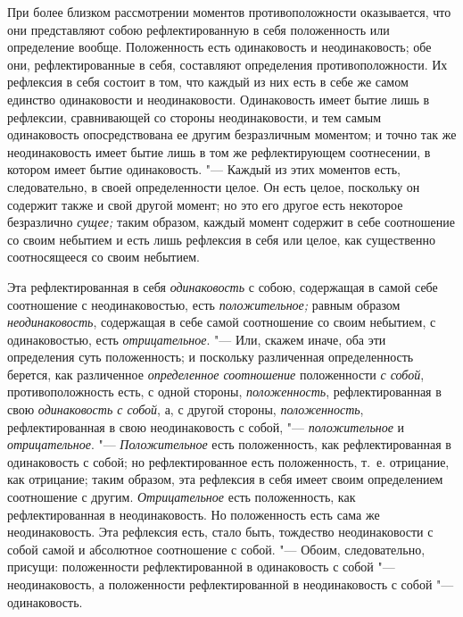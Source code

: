 При более близком рассмотрении моментов противоположности оказывается, что
они представляют собою рефлектированную в себя положенность или определение
вообще. Положенность есть одинаковость и неодинаковость; обе они,
рефлектированные в себя, составляют определения противоположности. Их
рефлексия в себя состоит в том, что каждый из них есть в себе же самом
единство одинаковости и неодинаковости. Одинаковость имеет бытие лишь в
рефлексии, сравнивающей со стороны неодинаковости, и тем самым одинаковость
опосредствована ее другим безразличным моментом; и точно так же
неодинаковость имеет бытие лишь в том же рефлектирующем соотнесении, в
котором имеет бытие одинаковость. "--- Каждый из этих моментов есть,
следовательно, в своей определенности целое. Он есть целое, поскольку он
содержит также и свой другой момент; но это его другое есть некоторое
безразлично {\em сущее;} таким образом, каждый момент
содержит в себе соотношение со своим небытием и есть лишь рефлексия в себя
или целое, как существенно соотносящееся со своим небытием.

Эта рефлектированная в себя {\em одинаковость} с собою,
содержащая в самой себе соотношение с неодинаковостью, есть
{\em положительное;} равным образом
{\em неодинаковость}, содержащая в себе самой
соотношение со своим небытием, с одинаковостью, есть
{\em отрицательное}. "--- Или, скажем иначе, оба эти
определения суть положенность; и поскольку различенная определенность
берется, как различенное {\em определенное соотношение}
положенности {\em с собой}, противоположность есть, с
одной стороны, {\em положенность}, рефлектированная в
свою {\em одинаковость с собой}, а, с другой стороны,
{\em положенность}, рефлектированная в свою
неодинаковость с собой, "--- {\em положительное} и
{\em отрицательное}. "--- {\em Положительное} есть положенность, как
рефлектированная в одинаковость с собой; но рефлектированное есть
положенность, т.~е. отрицание, как отрицание; таким образом, эта рефлексия
в себя имеет своим определением соотношение с другим.
{\em Отрицательное} есть положенность, как
рефлектированная в неодинаковость. Но положенность есть сама же
неодинаковость. Эта рефлексия есть, стало быть, тождество неодинаковости с
собой самой и абсолютное соотношение с собой. "--- Обоим, следовательно,
присущи: положенности рефлектированной в одинаковость с собой
"--- неодинаковость, а положенности рефлектированной в неодинаковость с собой
"--- одинаковость.

